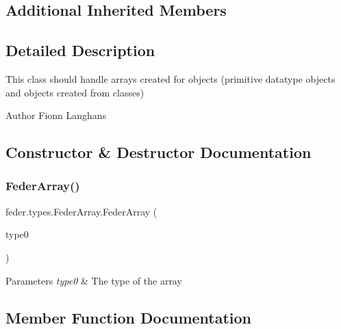\subsection*{Additional Inherited Members}


\subsection{Detailed Description}
This class should handle arrays created for objects (primitive datatype objects and objects created from classes)

\begin{DoxyAuthor}{Author}
Fionn Langhans 
\end{DoxyAuthor}


\subsection{Constructor \& Destructor Documentation}
\mbox{\label{classfeder_1_1types_1_1FederArray_a0f799437788cc7f8d6beff53667fda6f}} 
\subsubsection{\texorpdfstring{Feder\+Array()}{FederArray()}}
{\footnotesize\ttfamily feder.\+types.\+Feder\+Array.\+Feder\+Array (\begin{DoxyParamCaption}\item[{\hyperlink{classfeder_1_1types_1_1FederBinding}{Feder\+Binding}}]{type0 }\end{DoxyParamCaption})}


\begin{DoxyParams}{Parameters}
{\em type0} & The type of the array \\
\hline
\end{DoxyParams}


\subsection{Member Function Documentation}
\mbox{\label{classfeder_1_1types_1_1FederArray_ac6c0b3642d82efecc34be9a73c8447e8}} 
